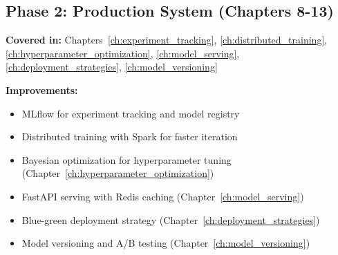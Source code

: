 \subsection{Phase 2: Production System (Chapters 8-13)}

\textbf{Covered in:} Chapters~\ref{ch:experiment_tracking}, \ref{ch:distributed_training}, \ref{ch:hyperparameter_optimization}, \ref{ch:model_serving}, \ref{ch:deployment_strategies}, \ref{ch:model_versioning}

\textbf{Improvements:}
\begin{itemize}
    \item MLflow for experiment tracking and model registry
    \item Distributed training with Spark for faster iteration
    \item Bayesian optimization for hyperparameter tuning (Chapter~\ref{ch:hyperparameter_optimization})
    \item FastAPI serving with Redis caching (Chapter~\ref{ch:model_serving})
    \item Blue-green deployment strategy (Chapter~\ref{ch:deployment_strategies})
    \item Model versioning and A/B testing (Chapter~\ref{ch:model_versioning})
\end{itemize}

